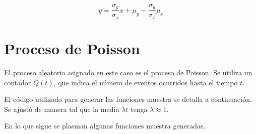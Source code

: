 \[
y = \frac{\sigma_y}{\sigma_x}x + \mu_y - \frac{\sigma_y}{\sigma_x} \mu_x
\] 

\newpage

\section{Proceso de Poisson}

El proceso aleatorio asignado en este caso es el proceso de Poisson. Se utiliza un contador $Q(t)$, que indica el n\'umero de eventos ocurridos hasta el tiempo $t$.\par
El c\'odigo utilizado para generar las funciones muestra se detalla a continuaci\'on. Se ajust\'o de manera tal que la media $\lambda t$ tenga $\lambda \approx 1$.



En lo que sigue se plasman algunas funciones muestra generadas.

